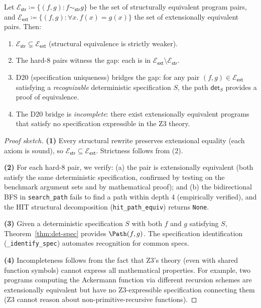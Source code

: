 \begin{theorem}
\label{thm:boundary}
Let $\mathcal{E}_{\mathsf{str}} \coloneqq \{(f, g) : f \sim_{\mathsf{str}} g\}$
be the set of structurally equivalent program pairs, and
$\mathcal{E}_{\mathsf{ext}} \coloneqq \{(f, g) : \forall x.\, f(x) = g(x)\}$
the set of extensionally equivalent pairs.  Then:
\begin{enumerate}
  \item $\mathcal{E}_{\mathsf{str}} \subsetneq \mathcal{E}_{\mathsf{ext}}$
    (structural equivalence is strictly weaker).
  \item The hard-8 pairs witness the gap:
    each is in $\mathcal{E}_{\mathsf{ext}} \setminus
    \mathcal{E}_{\mathsf{str}}$.
  \item D20 (specification uniqueness) bridges the gap: for any pair
    $(f, g) \in \mathcal{E}_{\mathsf{ext}}$ satisfying a
    \emph{recognizable} deterministic specification $S$, the path
    $\mathsf{det}_S$ provides a proof of equivalence.
  \item The D20 bridge is \emph{incomplete}: there exist extensionally
    equivalent programs that satisfy no specification expressible in
    the Z3 theory.
\end{enumerate}
\end{theorem}

\begin{proof}[Proof sketch]
\textbf{(1)} Every structural rewrite preserves extensional equality
(each axiom is sound), so
$\mathcal{E}_{\mathsf{str}} \subseteq \mathcal{E}_{\mathsf{ext}}$.
Strictness follows from (2).

\textbf{(2)} For each hard-8 pair, we verify:
(a) the pair is extensionally equivalent (both satisfy the same
deterministic specification, confirmed by testing on the benchmark
argument sets and by mathematical proof); and
(b) the bidirectional BFS in \texttt{search\_path} fails to find a
path within depth 4 (empirically verified), and the HIT structural
decomposition (\texttt{hit\_path\_equiv}) returns \texttt{None}.

\textbf{(3)} Given a deterministic specification $S$ with both $f$ and
$g$ satisfying $S$, Theorem~\ref{thm:det-spec} provides
$\Path(f, g)$.  The specification identification
(\texttt{\_identify\_spec}) automates recognition for common specs.

\textbf{(4)} Incompleteness follows from the fact that Z3's theory
(even with shared function symbols) cannot express all mathematical
properties.  For example, two programs computing the Ackermann function
via different recursion schemes are extensionally equivalent but have
no Z3-expressible specification connecting them (Z3 cannot reason
about non-primitive-recursive functions).
\end{proof}

